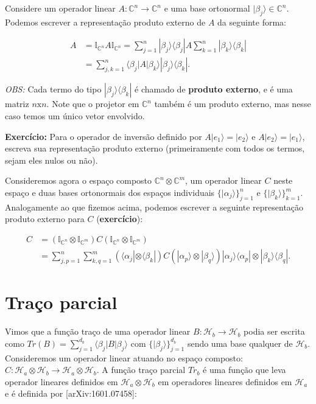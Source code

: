 \documentclass[11pt]{article}
\begin{document}
Considere um operador linear
\(A:\mathbb{C}^{n}\rightarrow\mathbb{C}^{n}\) e uma base ortonormal
\(|\beta_{j}\rangle\in\mathbb{C}^{n}\). Podemos escrever a representação
produto externo de \(A\) da seguinte forma:

\begin{align}
A & = \mathbb{I}_{\mathbb{C}^{n}}A\mathbb{I}_{\mathbb{C}^{n}} = \sum_{j=1}^{n}|\beta_{j}\rangle\langle\beta_{j}|A\sum_{k=1}^{n}|\beta_{k}\rangle\langle\beta_{k}| \\
& = \sum_{j,k=1}^{n}\langle\beta_{j}|A|\beta_{k}\rangle|\beta_{j}\rangle\langle\beta_{k}|.
\end{align}

\emph{OBS:} Cada termo do tipo \(|\beta_{j}\rangle\langle\beta_{k}|\) é
chamado de \textbf{produto externo}, e é uma matriz \(n\mathrm{x}n\).
Note que o projetor em \(\mathbb{C}^{n}\) também é um produto externo,
mas nesse caso temos um único vetor envolvido.

\textbf{Exercício:} Para o operador de inversão definido por
\(A|e_{1}\rangle=|e_{2}\rangle\) e \(A|e_{2}\rangle=|e_{1}\rangle\),
escreva sua representação produto externo (primeiramente com todos os
termos, sejam eles nulos ou não).

Consideremos agora o espaço composto
\(\mathbb{C}^{n}\otimes\mathbb{C}^{m}\), um operador linear \(C\) neste
espaço e duas bases ortonormais dos espaços individuais
\(\{|\alpha_{j}\rangle\}_{j=1}^{n}\) e
\(\{|\beta_{k}\rangle\}_{k=1}^{m}\). Analogamente ao que fizemos acima,
podemos escrever a seguinte representação produto externo para \(C\)
(\textbf{exercício}):

\begin{align}
C & = (\mathbb{I}_{\mathbb{C}^{n}}\otimes\mathbb{I}_{\mathbb{C}^{m}})C(\mathbb{I}_{\mathbb{C}^{n}}\otimes\mathbb{I}_{\mathbb{C}^{m}}) \\
& = \sum_{j,p=1}^{n}\sum_{k,q=1}^{m}(\langle\alpha_{j}|\otimes\langle\beta_{k}|)C(|\alpha_{p}\rangle\otimes|\beta_{q}\rangle)|\alpha_{j}\rangle\langle\alpha_{p}|\otimes|\beta_{k}\rangle\langle\beta_{q}|.
\end{align}

    \section{Traço parcial}\label{trauxe7o-parcial}

Vimos que a função traço de uma operador linear
\(B:\mathcal{H}_{b}\rightarrow\mathcal{H}_{b}\) podia ser escrita como
\(Tr(B)=\sum_{j=1}^{d_{b}}\langle\beta_{j}|B|\beta_{j}\rangle\) com
\(\{|\beta_{j}\rangle\}_{j=1}^{d_{b}}\) sendo uma base qualquer de
\(\mathcal{H}_{b}\). Consideremos um operador linear atuando no espaço
composto:
\(C:\mathcal{H}_{a}\otimes\mathcal{H}_{b}\rightarrow\mathcal{H}_{a}\otimes\mathcal{H}_{b}\).
A função traço parcial \(Tr_{b}\) é uma função que leva operador
lineares definidos em \(\mathcal{H}_{a}\otimes\mathcal{H}_{b}\) em
operadores lineares definidos em \(\mathcal{H}_{a}\) e é definida por
{[}arXiv:1601.07458{]}:
\end{document}
